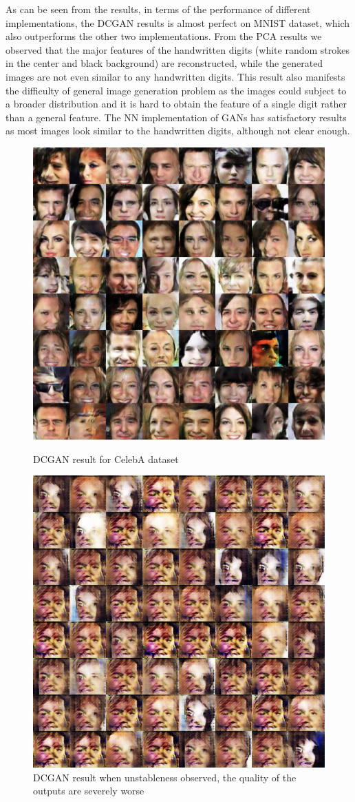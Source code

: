 \documentclass[10pt,twocolumn,letterpaper]{article}
\begin{document}
As can be seen from the results, in terms of the performance of different implementations, the DCGAN results is almost perfect on MNIST dataset, which also outperforms the other two implementations. From the PCA results we observed that the major features of the handwritten digits (white random strokes in the center and black background) are reconstructed, while the generated images are not even similar to any handwritten digits. This result also manifests the difficulty of general image generation problem as the images could subject to a broader distribution and it is hard to obtain the feature of a single digit rather than a general feature. The NN implementation of GANs has satisfactory results as most images look similar to the handwritten digits, although not clear enough.\\
\begin{figure}[h]
\begin{center}
   \includegraphics[width=0.6\linewidth]{img/celeb.png}
\end{center}
   \caption{DCGAN result for CelebA dataset}
\label{fig:long}
\label{fig:onecol}
\begin{center}
   \includegraphics[width=0.6\linewidth]{img/celebfail.png}
\end{center}
   \caption{DCGAN result when unstableness observed, the quality of the outputs are severely worse}
\label{fig:long}
\label{fig:onecol}
\end{figure}
\end{document}
